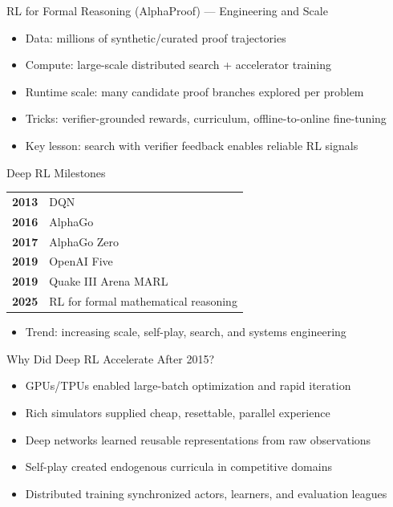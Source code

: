 \documentclass[aspectratio=169]{beamer}
\begin{document}
\begin{frame}{RL for Formal Reasoning (AlphaProof) --- Engineering and Scale}
\begin{itemize}
  \item Data: millions of synthetic/curated proof trajectories
  \item Compute: large-scale distributed search + accelerator training
  \item Runtime scale: many candidate proof branches explored per problem
  \item Tricks: verifier-grounded rewards, curriculum, offline-to-online fine-tuning
  \item Key lesson: search with verifier feedback enables reliable RL signals
\end{itemize}
\end{frame}

\begin{frame}{Deep RL Milestones}
\centering
\begin{tabular}{ll}
\textbf{2013} & DQN \\
\textbf{2016} & AlphaGo \\
\textbf{2017} & AlphaGo Zero \\
\textbf{2019} & OpenAI Five \\
\textbf{2019} & Quake III Arena MARL \\
\textbf{2025} & RL for formal mathematical reasoning
\end{tabular}
\begin{itemize}
  \item Trend: increasing scale, self-play, search, and systems engineering
\end{itemize}
\end{frame}

\begin{frame}{Why Did Deep RL Accelerate After 2015?}
\begin{itemize}
  \item GPUs/TPUs enabled large-batch optimization and rapid iteration
  \item Rich simulators supplied cheap, resettable, parallel experience
  \item Deep networks learned reusable representations from raw observations
  \item Self-play created endogenous curricula in competitive domains
  \item Distributed training synchronized actors, learners, and evaluation leagues
\end{itemize}
\end{frame}
\end{document}
